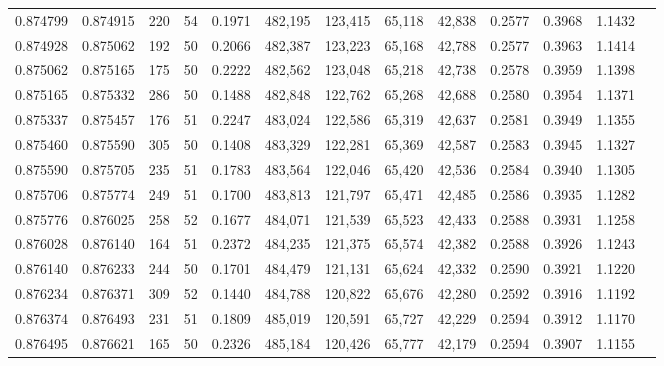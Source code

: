 \begin{tabular}{rrrrrrrrrrrrr}
0.874799 & 0.874915 &   220 &  54 &                                     0.1971 & 482,195 & 123,415 &  65,118 &  42,838 & 0.2577 & 0.3968 & 1.1432 \\
0.874928 & 0.875062 &   192 &  50 &                                     0.2066 & 482,387 & 123,223 &  65,168 &  42,788 & 0.2577 & 0.3963 & 1.1414 \\
0.875062 & 0.875165 &   175 &  50 &                                     0.2222 & 482,562 & 123,048 &  65,218 &  42,738 & 0.2578 & 0.3959 & 1.1398 \\
0.875165 & 0.875332 &   286 &  50 &                                     0.1488 & 482,848 & 122,762 &  65,268 &  42,688 & 0.2580 & 0.3954 & 1.1371 \\
0.875337 & 0.875457 &   176 &  51 &                                     0.2247 & 483,024 & 122,586 &  65,319 &  42,637 & 0.2581 & 0.3949 & 1.1355 \\
0.875460 & 0.875590 &   305 &  50 &                                     0.1408 & 483,329 & 122,281 &  65,369 &  42,587 & 0.2583 & 0.3945 & 1.1327 \\
0.875590 & 0.875705 &   235 &  51 &                                     0.1783 & 483,564 & 122,046 &  65,420 &  42,536 & 0.2584 & 0.3940 & 1.1305 \\
0.875706 & 0.875774 &   249 &  51 &                                     0.1700 & 483,813 & 121,797 &  65,471 &  42,485 & 0.2586 & 0.3935 & 1.1282 \\
0.875776 & 0.876025 &   258 &  52 &                                     0.1677 & 484,071 & 121,539 &  65,523 &  42,433 & 0.2588 & 0.3931 & 1.1258 \\
0.876028 & 0.876140 &   164 &  51 &                                     0.2372 & 484,235 & 121,375 &  65,574 &  42,382 & 0.2588 & 0.3926 & 1.1243 \\
0.876140 & 0.876233 &   244 &  50 &                                     0.1701 & 484,479 & 121,131 &  65,624 &  42,332 & 0.2590 & 0.3921 & 1.1220 \\
0.876234 & 0.876371 &   309 &  52 &                                     0.1440 & 484,788 & 120,822 &  65,676 &  42,280 & 0.2592 & 0.3916 & 1.1192 \\
0.876374 & 0.876493 &   231 &  51 &                                     0.1809 & 485,019 & 120,591 &  65,727 &  42,229 & 0.2594 & 0.3912 & 1.1170 \\
0.876495 & 0.876621 &   165 &  50 &                                     0.2326 & 485,184 & 120,426 &  65,777 &  42,179 & 0.2594 & 0.3907 & 1.1155 \\

\end{tabular}
